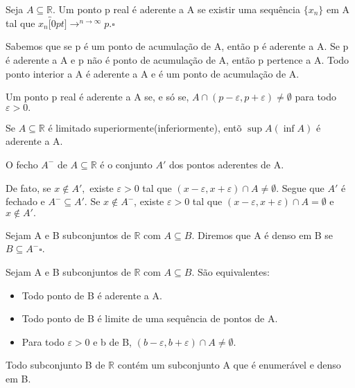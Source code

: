 \documentclass[analysis_notes.tex]{subfiles}
\begin{document}
\begin{def*}
	Seja $A\subseteq{\mathbb{R}}$. Um ponto p real \'e aderente a A se existir uma sequ\^encia $\{x_{n}\}$ em A tal que $x_{n}\overbracket[0pt]{\longrightarrow}^{n\to \infty}p.\square$
\end{def*}
Sabemos que se p \'e um ponto de acumula\c c\~ao de A, ent\~ao p \'e aderente a A. Se p \'e aderente a A e p n\~ao \'e ponto de acumula\c c\~ao de A, ent\~ao
p pertence a A. Todo ponto interior a A \'e aderente a A e \'e um ponto de acumula\c c\~ao de A.
\begin{theorem*}
	Um ponto p real \'e aderente a A se, e s\'o se, $A\cap{(p-\varepsilon , p+\varepsilon )}\neq\emptyset$ para todo $\varepsilon  > 0.$
\end{theorem*}
\begin{crl*}
	Se $A\subseteq{\mathbb{R}}$ \'e limitado superiormente(inferiormente), ent\~o $\sup{A}(\inf{A})$ \'e aderente a A.
\end{crl*}
\begin{theorem*}
	O fecho $A^{-}$ de $A\subseteq{\mathbb{R}}$ \'e o conjunto $A'$ dos pontos aderentes de A.
\end{theorem*}
\begin{proof*}
	De fato, se $x\not\in A',$ existe $\varepsilon >0$ tal que $(x-\varepsilon ,x+\varepsilon )\cap{A}\neq\emptyset$. Segue que
	$A'$ \'e fechado e $A^{-}\subseteq{A'}$. Se $x\not\in A^{-}$, existe $\varepsilon >0$ tal que $(x-\varepsilon ,x+\varepsilon )\cap{A}=\emptyset$
	e $x\not\in A'.$ \qedsymbol
\end{proof*}
\begin{def*}
	Sejam A e B subconjuntos de $\mathbb{R}$ com $A\subseteq{B}.$ Diremos que A \'e denso em B se $B\subseteq{A^{-}}\square$.
\end{def*}
\begin{theorem*}
	Sejam A e B subconjuntos de $\mathbb{R}$ com $A\subseteq{B}$. S\~ao equivalentes:
	\begin{itemize}
		\item Todo ponto de B \'e aderente a A.
		\item Todo ponto de B \'e limite de uma sequ\^encia de pontos de A.
		\item Para todo $\varepsilon >0$ e b de B, $(b-\varepsilon , b+\varepsilon )\cap{A}\neq\emptyset.$
	\end{itemize}
\end{theorem*}
\begin{theorem*}
	Todo subconjunto B de $\mathbb{R}$ cont\'em um subconjunto A que \'e enumer\'avel e denso em B.
\end{theorem*}
\end{document}
